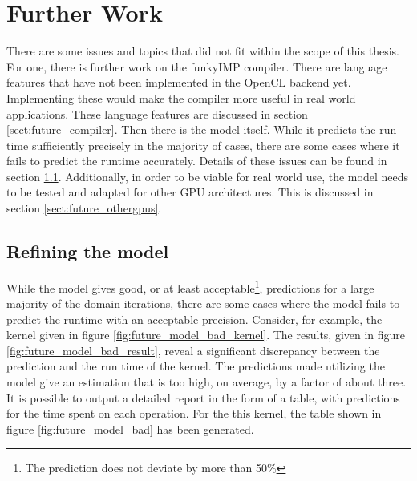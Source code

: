 
\chapter{Further Work}
\label{chap:future}
There are some issues and topics that did not fit within the scope of this thesis. For one, there is further work on the funkyIMP compiler. There are language features that have not been implemented in the OpenCL backend yet. Implementing these would make the compiler more useful in real world applications. These language features are discussed in section \ref{sect:future_compiler}. Then there is the model itself. While it predicts the run time sufficiently precisely in the majority of cases, there are some cases where it fails to predict the runtime accurately. Details of these issues can be found in section \ref{sect:future_model}. Additionally, in order to be viable for real world use, the model needs to be tested and adapted for other GPU architectures. This is discussed in section \ref{sect:future_othergpus}.


\section{Refining the model}
\label{sect:future_model}
While the model gives good, or at least acceptable\footnote{The prediction does not deviate by more than 50\%}, predictions for a large majority of the domain iterations, there are some cases where the model fails to predict the runtime with an acceptable precision. Consider, for example, the kernel given in figure \ref{fig:future_model_bad_kernel}. The results, given in figure \ref{fig:future_model_bad_result}, reveal a significant discrepancy between the prediction and the run time of the kernel. The predictions made utilizing the model give an estimation that is too high, on average, by a factor of about three. It is possible to output a detailed report in the form of a table, with predictions for the time spent on each operation. For the this kernel, the table shown in figure \ref{fig:future_model_bad} has been generated. \\


